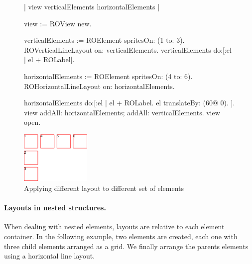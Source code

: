 \documentclass[a4paper,10pt,twoside]{book}
\begin{document}
\begin{figure}[H]
\label{fig:differentLayouts}
\vspace{0pt}
	\begin{minipage}[t]{1\textwidth}
     \begin{code}{}
| view verticalElements horizontalElements |

view := ROView new.

verticalElements := ROElement spritesOn: (1 to: 3).
ROVerticalLineLayout on: verticalElements.
verticalElements do:[:el | el + ROLabel].
	
horizontalElements := ROElement spritesOn: (4 to: 6).
ROHorizontalLineLayout on: horizontalElements.
	
horizontalElements do:[:el |
	el + ROLabel.
	el translateBy: (60@ 0).
].	
view 
	addAll: horizontalElements; 
	addAll: verticalElements.
view open.
  \end{code}
   \end{minipage}  

\hfill
   \begin{minipage}[t]{1\textwidth}
      \vspace{0pt} \raggedright
       \centering
		\includegraphics[width=0.3\textwidth]{differentLayouts} 
   \end{minipage}
\caption{Applying different layout to different set of elements}
\end{figure} 



\paragraph{Layouts in nested structures.}
When dealing with nested elements, layouts are relative to each element container. In the following example, two elements are created, each one with three child elements arranged as a grid. We finally arrange the parents elements using a horizontal line layout.
\end{document}
